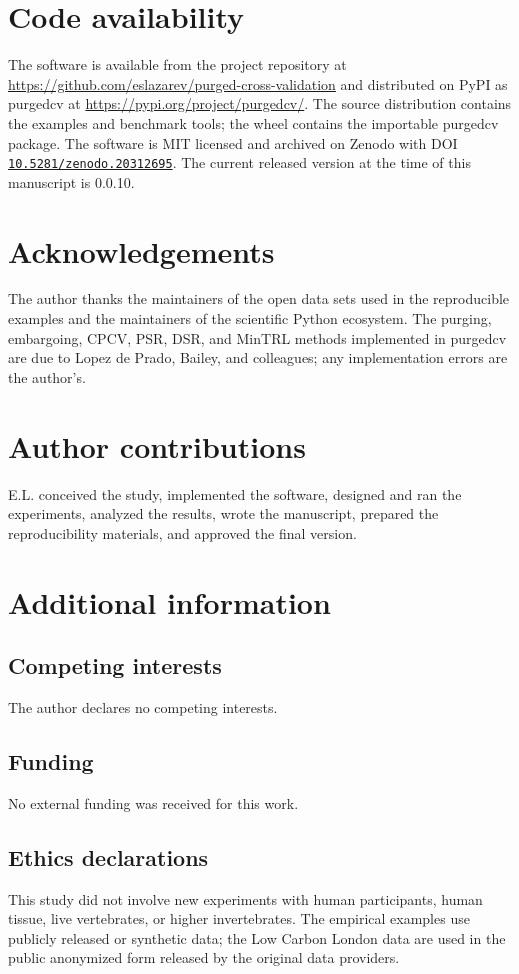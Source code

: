 \documentclass[10pt]{article}
\newcommand{\pcv}{\textsf{purgedcv}}
\newcommand{\pkg}[1]{\textsf{#1}}
\newcommand{\doi}[1]{\href{https://doi.org/#1}{\nolinkurl{#1}}}
\begin{document}
\section*{Code availability}

The software is available from the project repository at
\url{https://github.com/eslazarev/purged-cross-validation} and distributed on
PyPI as \pkg{purgedcv} at \url{https://pypi.org/project/purgedcv/}. The source
distribution contains the examples and benchmark tools; the wheel contains the
importable \pcv{} package. The software is MIT licensed and archived on Zenodo
with DOI \doi{10.5281/zenodo.20312695}. The current released version at the
time of this manuscript is 0.0.10.




\section*{Acknowledgements}

The author thanks the maintainers of the open data sets used in the
reproducible examples and the maintainers of the scientific Python ecosystem.
The purging, embargoing, CPCV, PSR, DSR, and MinTRL methods implemented in
\pcv{} are due to Lopez de Prado, Bailey, and colleagues; any implementation
errors are the author's.

\section*{Author contributions}

E.L. conceived the study, implemented the software, designed and ran the
experiments, analyzed the results, wrote the manuscript, prepared the
reproducibility materials, and approved the final version.

\section*{Additional information}

\subsection*{Competing interests}

The author declares no competing interests.

\subsection*{Funding}

No external funding was received for this work.

\subsection*{Ethics declarations}

This study did not involve new experiments with human participants, human
tissue, live vertebrates, or higher invertebrates. The empirical examples use
publicly released or synthetic data; the Low Carbon London data are used in the
public anonymized form released by the original data providers.
\end{document}
